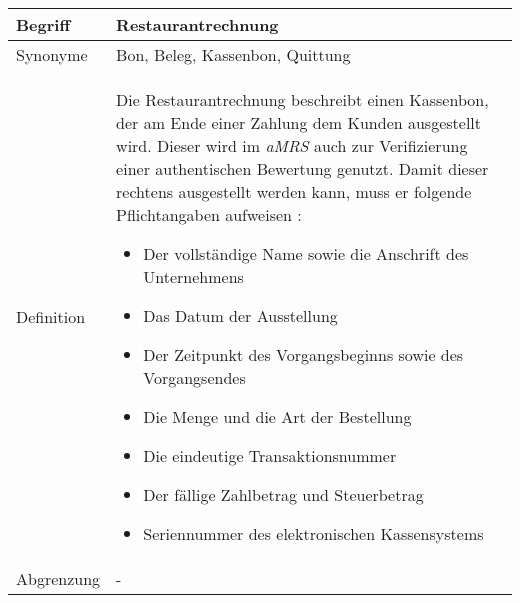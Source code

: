 \begin{table}[H]
    \centering
    \label{gls:restaurantRechnung}
    \begin{tabularx}{\textwidth}{| l | X |}
        \hline
        Begriff         & Restaurantrechnung                                                                                                                                                                                                                                                                                                                                \\
        \hline
        Synonyme        & Bon, Beleg, Kassenbon, Quittung                                                                                                                                                                                                                                                                                                                   \\
        \hline
        Definition      & Die Restaurantrechnung beschreibt einen Kassenbon, der am Ende einer Zahlung dem Kunden ausgestellt wird. Dieser wird im \textit{aMRS} auch zur Verifizierung einer authentischen Bewertung genutzt. Damit dieser rechtens ausgestellt werden kann, muss er folgende Pflichtangaben aufweisen \autocite{bernhard_kostler_kassenbon-pflicht_2022}:
        \begin{itemize}
            \item Der vollständige Name sowie die Anschrift des Unternehmens
            \item Das Datum der Ausstellung
            \item Der Zeitpunkt des Vorgangsbeginns sowie des Vorgangsendes
            \item Die Menge und die Art der Bestellung
            \item Die eindeutige Transaktionsnummer
            \item Der fällige Zahlbetrag und Steuerbetrag
            \item Seriennummer des elektronischen Kassensystems
        \end{itemize}
        \\
        \hline
        Abgrenzung      & -                                                                                                                                                                                                                                                                                                                                                 \\

\end{tabularx}
\end{table}
